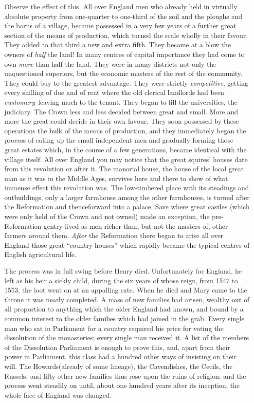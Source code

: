 \documentclass{book}
\begin{document}
Observe the effect of this. All over England men who already held in virtually absolute property from one-quarter to one-third of the soil and the ploughs and the barns of a village, became possessed in a very few years of a further great section of the means of production, which turned the scale wholly in their favour. They added to that third a new and extra fifth. They became at a blow the owners of \emph{half} the land! In many centres of capital importance they had come to own \emph{more} than half the land. They were in many districts not only the unquestioned superiors, but the economic masters of the rest of the community. They could buy to the greatest advantage. They were strictly \emph{competitive}, getting every shilling of due and of rent where the old clerical landlords had been \emph{customary}–leaving much to the tenant. They began to fill the universities, the judiciary. The Crown less and less decided between great and small. More and more the great could decide in their own favour. They soon possessed by these operations the bulk of the means of production, and they immediately began the process of eating up the small independent men and gradually forming those great estates which, in the course of a few generations, became identical with the village itself. All over England you may notice that the great squires’ houses date from this revolution or after it. The manorial house, the house of the local great man as it was in the Middle Ages, survives here and there to show of what immense effect this revolution was. The low-timbered place with its steadings and outbuildings, only a larger farmhouse among the other farmhouses, is turned after the Reformation and thenceforward into a palace. Save where great castles (which were only held of the Crown and not owned) made an exception, the pre-Reformation gentry lived as men richer than, but not the masters of, other farmers around them. \emph{After} the Reformation there began to arise all over England those great “country houses” which rapidly became the typical centres of English agricultural life.

The process was in full swing before Henry died. Unfortunately for England, he left as his heir a sickly child, during the six years of whose reign, from 1547 to 1553, the loot went on at an appalling rate. When he died and Mary came to the throne it was nearly completed. A mass of new families had arisen, wealthy out of all proportion to anything which the older England had known, and bound by a common interest to the older families which had joined in the grab. Every single man who sat in Parliament for a country required his price for voting the dissolution of the monasteries; every single man received it. A list of the members of the Dissolution Parliament is enough to prove this, and, apart from their power in Parliament, this class had a hundred other ways of insisting on their will. The Howards(already of some lineage), the Cavendishes, the Cecils, the Russels, and fifty other new families thus rose upon the ruins of religion; and the process went steadily on until, about one hundred years after its inception, the whole face of England was changed.
\end{document}
